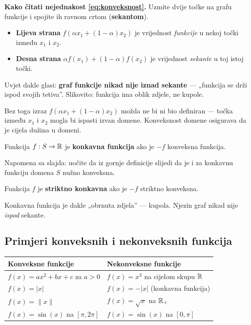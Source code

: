 \textbf{Kako čitati nejednakost \eqref{eq:konveksnost}.} Uzmite dvije točke na
grafu funkcije i spojite ih ravnom crtom (\textbf{sekantom}).

\begin{itemize}
  \item \textbf{Lijeva strana} $f(\alpha x_1 + (1-\alpha)x_2)$ je vrijednost
        \emph{funkcije} u nekoj točki između $x_1$ i $x_2$.
  \item \textbf{Desna strana} $\alpha f(x_1) + (1-\alpha)f(x_2)$ je vrijednost
        \emph{sekante} u toj istoj točki.
\end{itemize}

Uvjet dakle glasi: \textbf{graf funkcije nikad nije iznad sekante} --- „funkcija
se drži ispod svojih tetiva”. Slikovito: funkcija ima oblik zdjele, ne kupole.

\begin{napomena}
Bez toga izraz $f(\alpha x_1 + (1-\alpha)x_2)$ možda ne bi ni bio definiran ---
točka između $x_1$ i $x_2$ mogla bi ispasti izvan domene. Konveksnost domene
osigurava da je cijela dužina u domeni.
\end{napomena}

\begin{definicija}
Funkcija $f : S \to \mathbb{R}$ je \textbf{konkavna funkcija} ako je $-f$ konveksna
funkcija.

Napomena sa slajda: uočite da iz gornje definicije slijedi da je i za konkavnu
funkciju domena $S$ nužno konveksna.

Funkcija $f$ je \textbf{striktno konkavna} ako je $-f$ striktno konveksna.
\end{definicija}

Konkavna funkcija je dakle „obrnuta zdjela” --- kupola. Njezin graf nikad nije
\emph{ispod} sekante.

\subsection{Primjeri konveksnih i nekonveksnih funkcija}

\begin{center}
\begin{tabular}{P{6.2cm}P{6.6cm}}
\toprule
\textbf{Konveksne funkcije} & \textbf{Nekonveksne funkcije} \\
\midrule
$f(x) = ax^2 + bx + c$ za $a > 0$ & $f(x) = x^3$ na cijelom skupu $\mathbb{R}$ \\
$f(x) = |x|$                      & $f(x) = -|x|$ (konkavna funkcija) \\
$f(x) = \|x\|$                    & $f(x) = \sqrt{x}$ na $\mathbb{R}_+$ \\
$f(x) = \sin(x)$ na $[\pi, 2\pi]$ & $f(x) = \sin(x)$ na $[0, \pi]$ \\
\bottomrule
\end{tabular}
\end{center}


